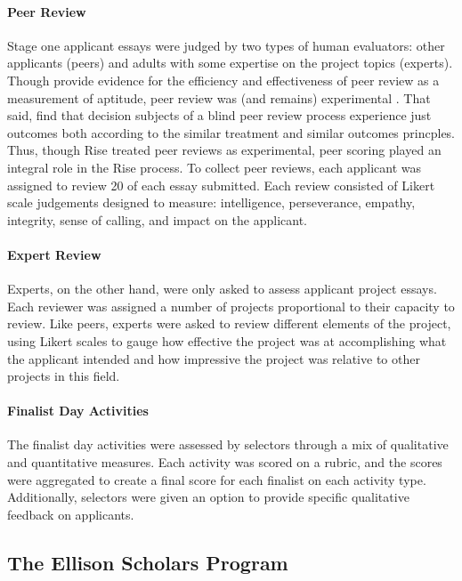 \paragraph{Peer Review}
Stage one applicant essays were judged by two types of human evaluators: other applicants (peers) and adults with some expertise on the project topics (experts). Though \textcite{Anvari2021EffectivenessOP} provide evidence for the efficiency and effectiveness of peer review as a measurement of aptitude, peer review was (and remains) experimental \cite{Rahmatillah2022AnalyzingFA}. That said, \textcite{VanderSchee2022UsingCP} find that decision subjects of a blind peer review process experience just outcomes both according to the similar treatment and similar outcomes princples. Thus, though Rise treated peer reviews as experimental, peer scoring played an integral role in the Rise process. To collect peer reviews, each applicant was assigned to review 20 of each essay submitted. Each review consisted of Likert scale judgements designed to measure: intelligence, perseverance, empathy, integrity, sense of calling, and impact on the applicant.

\paragraph{Expert Review} 
Experts, on the other hand, were only asked to assess applicant project essays. Each reviewer was assigned a number of projects proportional to their capacity to review. Like peers, experts were asked to review different elements of the project, using Likert scales to gauge how effective the project was at accomplishing what the applicant intended and how impressive the project was relative to other projects in this field. 

\paragraph{Finalist Day Activities}
The finalist day activities were assessed by selectors through a mix of qualitative and quantitative measures. Each activity was scored on a rubric, and the scores were aggregated to create a final score for each finalist on each activity type. Additionally, selectors were given an option to provide specific qualitative feedback on applicants.

\subsection{The Ellison Scholars Program}\label{ssec:ellison}
